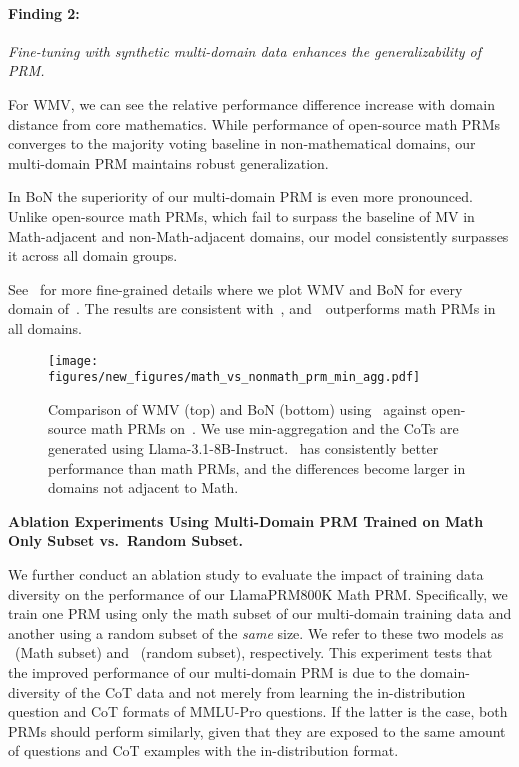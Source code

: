 \begin{highlight}
    \paragraph{Finding 2:} 
    \emph{Fine-tuning with synthetic multi-domain data enhances the generalizability of PRM.}
\end{highlight}


For WMV, we can see the relative performance difference increase with domain distance from core mathematics. While performance of open-source math PRMs converges to the majority voting baseline in non-mathematical domains, our multi-domain PRM maintains robust generalization.


In BoN the superiority of our multi-domain PRM is even more pronounced. Unlike open-source math PRMs, which fail to surpass the baseline of MV in Math-adjacent and non-Math-adjacent domains,
our model consistently surpasses it across all domain groups.


See~ for more fine-grained details where we plot WMV and BoN for every domain of~\ourdataeval.
The results are consistent with~, and~\ourprm~outperforms math PRMs in all domains.



\begin{figure*}[t]
    \begin{center}
        \texttt{[image: figures/new\_figures/math\_vs\_nonmath\_prm\_min\_agg.pdf]}        
        \caption{Comparison of WMV (top) and BoN (bottom) using \ourprm~against open-source math PRMs on~\ourdataeval. We use min-aggregation and the CoTs are generated using Llama-3.1-8B-Instruct. \ourprm~has consistently better performance than math PRMs, and the differences become larger in domains not adjacent to Math.}
        \label{fig:math-wmv-min}
    \end{center}
    \vskip -0.2in
\end{figure*}


\textbf{Ablation Experiments Using Multi-Domain PRM Trained on Math Only Subset vs.~Random Subset.}

We further conduct an ablation study to evaluate the impact of training data diversity on the performance of our LlamaPRM800K Math PRM.
Specifically, we train one PRM using only the math subset of our multi-domain training data and another using a random subset of the \emph{same} size.
We refer to these two models as \ourprm~(Math subset) and \ourprm~(random subset), respectively.
This experiment tests that the improved performance of our multi-domain PRM is due to the domain-diversity of the CoT data and not merely from learning the in-distribution question and CoT formats of MMLU-Pro questions. If the latter is the case, both PRMs should perform similarly, given that they are exposed to the same amount of questions and CoT examples with the in-distribution format.

